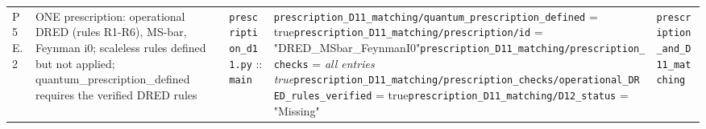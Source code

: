 {\begin{longtable}{@{}p{0.9cm}p{4.1cm}p{3.5cm}p{5.0cm}p{3.0cm}@{}}
P5E.2 & ONE prescription: operational DRED (rules R1-R6), MS-bar, Feynman i0; scaleless rules defined but not applied; quantum\_prescription\_defined requires the verified DRED rules & \texttt{prescription\_\allowbreak{}d11.\allowbreak{}py} :: \texttt{main} & \texttt{\allowbreak{}prescription\_\allowbreak{}D11\_\allowbreak{}matching/\allowbreak{}quantum\_\allowbreak{}prescription\_\allowbreak{}defined} = true\newline \texttt{\allowbreak{}prescription\_\allowbreak{}D11\_\allowbreak{}matching/\allowbreak{}prescription/\allowbreak{}id} = "\allowbreak{}DRED\_\allowbreak{}MSbar\_\allowbreak{}FeynmanI0"\newline \texttt{\allowbreak{}prescription\_\allowbreak{}D11\_\allowbreak{}matching/\allowbreak{}prescription\_\allowbreak{}checks} = \emph{all entries true}\newline \texttt{\allowbreak{}prescription\_\allowbreak{}D11\_\allowbreak{}matching/\allowbreak{}prescription\_\allowbreak{}checks/\allowbreak{}operational\_\allowbreak{}DRED\_\allowbreak{}rules\_\allowbreak{}verified} = true\newline \texttt{\allowbreak{}prescription\_\allowbreak{}D11\_\allowbreak{}matching/\allowbreak{}D12\_\allowbreak{}status} = "Missing" & \texttt{prescription\_\allowbreak{}and\_\allowbreak{}D11\_\allowbreak{}matching} \\

\end{longtable}}
